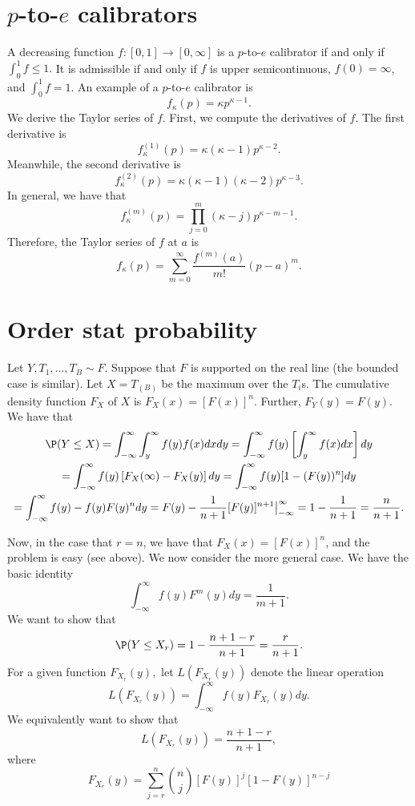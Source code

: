 \documentclass[12pt]{article}
\begin{document}
\section{$p$-to-$e$ calibrators}
A decreasing function $f : [0,1] \to [0,\infty]$ is a $p$-to-$e$ calibrator if and only if $\int_0^1 f \leq 1.$ It is admissible if and only if $f$ is upper semicontinuous, $f(0) = \infty$, and $\int_0^1 f = 1.$ An example of a $p$-to-$e$ calibrator is
$$f_\kappa(p) = \kappa p^{\kappa - 1}.$$
We derive the Taylor series of $f$. First, we compute the derivatives of $f$. The first derivative is 
$$f_\kappa^{(1)}(p) = \kappa(\kappa - 1) p^{\kappa - 2}.$$
Meanwhile, the second derivative is
$$f^{(2)}_\kappa(p) = \kappa(\kappa - 1) (\kappa - 2) p^{\kappa - 3}.$$ In general, we have that
$$f^{(m)}_\kappa(p) = \prod_{j=0}^m (\kappa - j)p^{\kappa - m- 1}.$$ Therefore, the Taylor series of $f$ at $a$ is
$$ f_\kappa(p) = \sum_{m=0}^\infty \frac{f^{(m)}(a)}{m!} (p - a)^m.$$

\section{Order stat probability}

Let $Y, T_1, \dots, T_B \sim F$. Suppose that $F$ is supported on the real line (the bounded case is similar). Let $X = T_{(B)}$ be the maximum over the $T_i$s. The cumulative density function $F_X$ of $X$ is $F_X(x) = [F(x)]^n$. Further, $F_Y(y)  = F(y).$ We have that
\begin{multline*}
\P(Y \leq X) = \int_{-\infty}^{\infty} \int_{y}^\infty f(y)f(x) dx dy = \int_{-\infty}^\infty f(y) \left[ \int_{y}^\infty f(x) dx \right] dy \\ = \int_{-\infty}^\infty f(y) \left[ F_X(\infty) - F_X(y) \right] dy = \int_{-\infty}^\infty f(y) [1 - (F(y))^n] dy \\= \int_{-\infty}^\infty f(y) - f(y)F(y)^n dy = F(y) - \frac{1}{n+1}[F(y)]^{n+1} \big|^\infty_{-\infty} = 1 - \frac{1}{n+1} = \frac{n}{n+1}.
\end{multline*}

Now, in the case that $r = n$, we have that $F_X(x) = [F(x)]^n$, and the problem is easy (see above). We now consider the more general case. We have the basic identity
$$ \int_{-\infty}^\infty f(y) F^m(y) dy = \frac{1}{m+1}.$$
We want to show that $$\P(Y \leq X_r) = 1 - \frac{n + 1 - r}{n+1} = \frac{r}{n+1}.$$ For a given function $F_{X_r}(y),$ let $L(F_{X_r}(y))$ denote the linear operation
$$ L(F_{X_r}(y)) = \int_{-\infty}^\infty f(y) F_{X_r}(y) dy.$$ We equivalently want to show that
$$ L(F_{X_r}(y)) = \frac{n+1-r}{n+1},$$
where
$$F_{X_r}(y) = \sum_{j=r}^n \binom{n}{j} [F(y)]^j[1 - F(y)]^{n-j}$$
\end{document}
